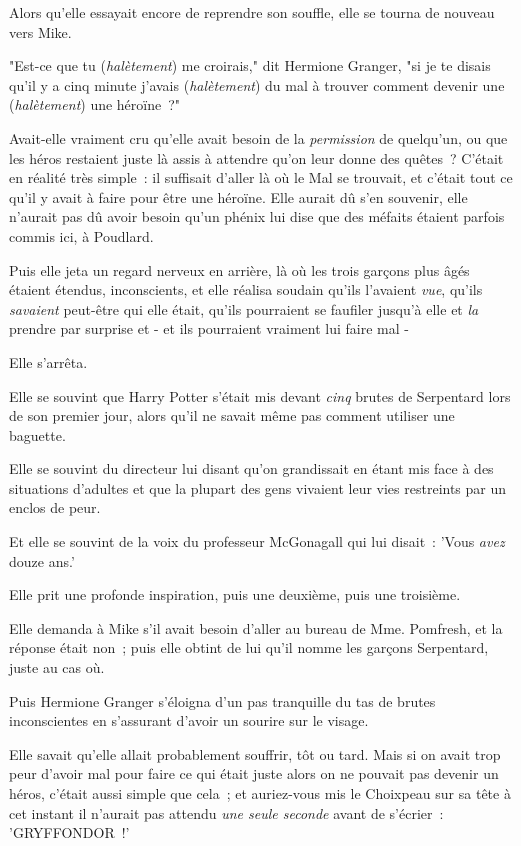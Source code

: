 Alors qu'elle essayait encore de reprendre son souffle, elle se tourna de nouveau vers Mike.

"Est-ce que tu (\emph{halètement}) me croirais," dit Hermione Granger, "si je te disais qu'il y a cinq minute j'avais (\emph{halètement}) du mal à trouver comment devenir une (\emph{halètement}) une héroïne~?"

Avait-elle vraiment cru qu'elle avait besoin de la \emph{permission} de quelqu'un, ou que les héros restaient juste là assis à attendre qu'on leur donne des quêtes~? C'était en réalité très simple~: il suffisait d'aller là où le Mal se trouvait, et c'était tout ce qu'il y avait à faire pour être une héroïne. Elle aurait dû s'en souvenir, elle n'aurait pas dû avoir besoin qu'un phénix lui dise que des méfaits étaient parfois commis ici, à Poudlard.

Puis elle jeta un regard nerveux en arrière, là où les trois garçons plus âgés étaient étendus, inconscients, et elle réalisa soudain qu'ils l'avaient \emph{vue}, qu'ils \emph{savaient} peut-être qui elle était, qu'ils pourraient se faufiler jusqu'à elle et \emph{la} prendre par surprise et - et ils pourraient vraiment lui faire mal -

Elle s'arrêta.

Elle se souvint que Harry Potter s'était mis devant \emph{cinq} brutes de Serpentard lors de son premier jour, alors qu'il ne savait même pas comment utiliser une baguette.

Elle se souvint du directeur lui disant qu'on grandissait en étant mis face à des situations d'adultes et que la plupart des gens vivaient leur vies restreints par un enclos de peur.

Et elle se souvint de la voix du professeur McGonagall qui lui disait~: 'Vous \emph{avez} douze ans.'

Elle prit une profonde inspiration, puis une deuxième, puis une troisième.

Elle demanda à Mike s'il avait besoin d'aller au bureau de Mme. Pomfresh, et la réponse était non~; puis elle obtint de lui qu'il nomme les garçons Serpentard, juste au cas où.

Puis Hermione Granger s'éloigna d'un pas tranquille du tas de brutes inconscientes en s'assurant d'avoir un sourire sur le visage.

Elle savait qu'elle allait probablement souffrir, tôt ou tard. Mais si on avait trop peur d'avoir mal pour faire ce qui était juste alors on ne pouvait pas devenir un héros, c'était aussi simple que cela~; et auriez-vous mis le Choixpeau sur sa tête à cet instant il n'aurait pas attendu \emph{une seule seconde} avant de s'écrier~: 'GRYFFONDOR~!'


